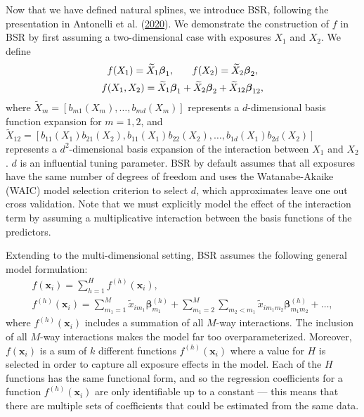 \documentclass[12pt, twoside]{amherstthesis}
\begin{document}
Now that we have defined natural splines, we introduce BSR, following the presentation in Antonelli et al. (\protect\hyperlink{ref-antonelli_estimating_2020}{2020}). We demonstrate the construction of \(f\) in BSR by first assuming a two-dimensional case with exposures \(X_1\) and \(X_2\). We define
\begin{gather*}
f(X_1) = \widetilde{X}_1\boldsymbol{\beta}_1, \hspace{0.25in} f(X_2) = \widetilde{X}_2\boldsymbol{\beta}_2,\\
f(X_1,X_2) = \widetilde{X}_1\boldsymbol{\beta}_1 + \widetilde{X}_2\boldsymbol{\beta}_2 + \widetilde{X}_{12}\boldsymbol{\beta}_{12},
\end{gather*}
\noindent where \(\widetilde{X}_m=[b_{m1}(X_m),\dots,b_{md}(X_m)]\) represents a \(d\)-dimensional basis function expansion for \(m=1,2\), and \(\widetilde{X}_{12}= [b_{11}(X_1)b_{21}(X_2), b_{11}(X_1)b_{22}(X_2), \dots, b_{1d}(X_1)b_{2d}(X_2)]\) represents a \(d^2\)-dimensional basis expansion of the interaction between \(X_1\) and \(X_2\). \(d\) is an influential tuning parameter. BSR by default assumes that all exposures have the same number of degrees of freedom and uses the Watanabe-Akaike (WAIC) model selection criterion to select \(d\), which approximates leave one out cross validation. Note that we must explicitly model the effect of the interaction term by assuming a multiplicative interaction between the basis functions of the predictors.

Extending to the multi-dimensional setting, BSR assumes the following general model formulation:
\begin{gather*}
f(\textbf{x}_i)= \sum_{h=1}^Hf^{(h)}(\textbf{x}_i), \\
f^{(h)}(\textbf{x}_i)= \sum_{m_1=1}^M\widetilde{x}_{im_1}\boldsymbol\beta_{m_1}^{(h)} + 
\sum_{m_1=2}^M\sum_{m_2<m_1}\widetilde{x}_{im_1m_2}\boldsymbol\beta_{m_1m_2}^{(h)} + \dots,
\end{gather*}
\noindent where \(f^{(h)}(\textbf{x}_i)\) includes a summation of all \(M\)-way interactions. The inclusion of all \(M\)-way interactions makes the model far too overparameterized. Moreover, \(f(\textbf{x}_i)\) is a sum of \(k\) different functions \(f^{(h)}(\textbf{x}_i)\) where a value for \(H\) is selected in order to capture all exposure effects in the model. Each of the \(H\) functions has the same functional form, and so the regression coefficients for a function \(f^{(h)}(\textbf{x}_i)\) are only identifiable up to a constant --- this means that there are multiple sets of coefficients that could be estimated from the same data.
\end{document}
